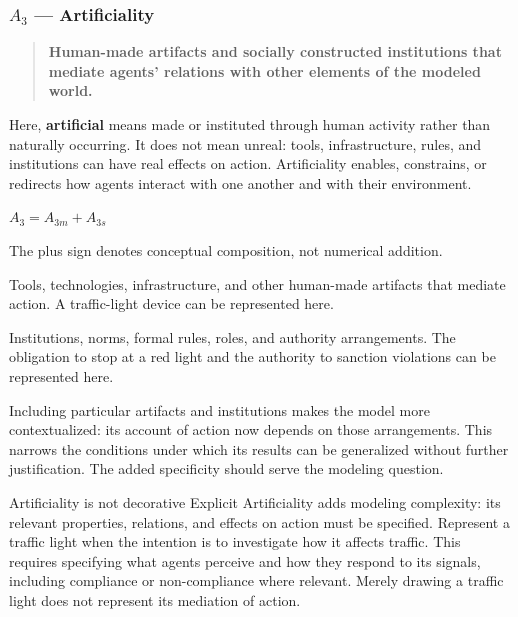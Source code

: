 \documentclass[11pt,a4paper]{article}
\newenvironment{fitdisplay}{\par\medskip\noindent\begin{lrbox}{\displaybox}$\displaystyle}{%
$\end{lrbox}\makebox[\linewidth][c]{\ifdim\wd\displaybox>\linewidth\resizebox{\linewidth}{!}{\usebox{\displaybox}}\else\usebox{\displaybox}\fi}\par\medskip}
\begin{document}
\subsubsection{\(A_3\) --- Artificiality}

\begin{quote}
\textbf{Human-made artifacts and socially constructed institutions that mediate agents' relations with other elements of the modeled world.}
\end{quote}

Here, \textbf{artificial} means made or instituted through human activity rather than naturally occurring. It does not mean unreal: tools, infrastructure, rules, and institutions can have real effects on action. Artificiality enables, constrains, or redirects how agents interact with one another and with their environment.

\begin{fitdisplay}
\boxed{A_3=A_{3m}+A_{3s}}
\end{fitdisplay}
The plus sign denotes conceptual composition, not numerical addition.

\begin{description}[style=nextline,leftmargin=0pt]
\item[$A_{3m}$ --- Material Artificiality] Tools, technologies, infrastructure, and other human-made artifacts that mediate action. A traffic-light device can be represented here.
\item[$A_{3s}$ --- Social Artificiality] Institutions, norms, formal rules, roles, and authority arrangements. The obligation to stop at a red light and the authority to sanction violations can be represented here.
\end{description}

Including particular artifacts and institutions makes the model more contextualized: its account of action now depends on those arrangements. This narrows the conditions under which its results can be generalized without further justification. The added specificity should serve the modeling question.

\begin{principle}{Artificiality is not decorative}
Explicit Artificiality adds modeling complexity: its relevant properties, relations, and effects on action must be specified. Represent a traffic light when the intention is to investigate how it affects traffic. This requires specifying what agents perceive and how they respond to its signals, including compliance or non-compliance where relevant. Merely drawing a traffic light does not represent its mediation of action.
\end{principle}
\end{document}
